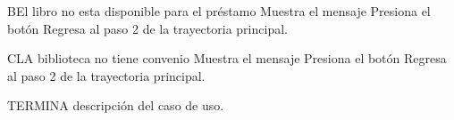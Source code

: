 		\begin{UCtrayectoriaA}{B}{El libro no esta disponible para el préstamo}
			\UCpaso[\UCsist] Muestra el mensaje 
			\UCpaso[\UCactor] Presiona el botón 			
			\UCpaso[\UCsist] Regresa al paso 2 de la trayectoria principal.
		\end{UCtrayectoriaA}
		
		\begin{UCtrayectoriaA}{C}{LA biblioteca no tiene convenio}
			\UCpaso[\UCsist] Muestra el mensaje 
			\UCpaso[\UCactor] Presiona el botón 
			\UCpaso[\UCsist] Regresa al paso 2 de la trayectoria principal.
		\end{UCtrayectoriaA}
TERMINA descripción del caso de uso.
